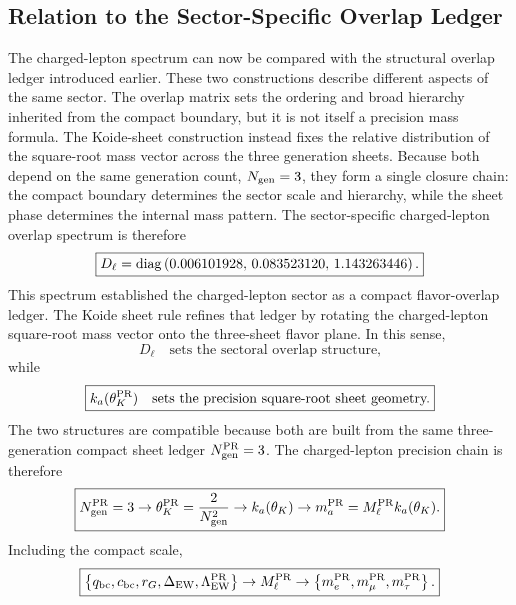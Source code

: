 \documentclass[11pt]{article}
\begin{document}
\subsection{Relation to the Sector-Specific Overlap Ledger}
\label{sec:pr2_charged_lepton_relation_to_overlap_ledger}
The charged-lepton spectrum can now be compared with the structural overlap ledger introduced earlier. These two constructions describe different aspects of the same sector. The overlap matrix sets the ordering and broad hierarchy inherited from the compact boundary, but it is not itself a precision mass formula. The Koide-sheet construction instead fixes the relative distribution of the square-root mass vector across the three generation sheets. Because both depend on the same generation count, \(N_{\rm gen}=3\), they form a single closure chain: the compact boundary determines the sector scale and hierarchy, while the sheet phase determines the internal mass pattern. The sector-specific charged-lepton overlap spectrum is therefore
\begin{equation}
\boxed{
D_\ell
=
{\rm diag}
\left(
0.006101928,\,
0.083523120,\,
1.143263446
\right).
}
\end{equation}
This spectrum established the charged-lepton sector as a compact flavor-overlap ledger. 
The Koide sheet rule refines that ledger by rotating the charged-lepton square-root mass vector onto the three-sheet flavor plane. 
In this sense,
\begin{equation}
\boxed{
D_\ell
\quad
\text{sets the sectoral overlap structure,}
}
\end{equation}
while
\begin{equation}
\boxed{
k_a(\theta_K^{\rm PR})
\quad
\text{sets the precision square-root sheet geometry.}
}
\end{equation}
The two structures are compatible because both are built from the same three-generation compact sheet ledger $N_{\rm gen}^{\rm PR}=3$. The charged-lepton precision chain is therefore
\begin{equation}
\boxed{
N_{\rm gen}^{\rm PR}=3
\rightarrow
\theta_K^{\rm PR}
=
\frac{2}{N_{\rm gen}^2}
\rightarrow
k_a(\theta_K)
\rightarrow
m_a^{\rm PR}
=
M_\ell^{\rm PR}k_a(\theta_K).
}
\end{equation}
Including the compact scale,
\begin{equation}
\boxed{
\left\{
q_{\rm bc},
c_{\rm bc},
r_G,
\Delta_{\rm EW},
\Lambda_{\rm EW}^{\rm PR}
\right\}
\rightarrow
M_\ell^{\rm PR}
\rightarrow
\left\{
m_e^{\rm PR},
m_\mu^{\rm PR},
m_\tau^{\rm PR}
\right\}.
}
\end{equation}
\end{document}
